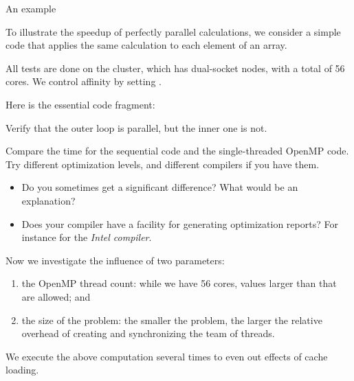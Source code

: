  {An example}

To illustrate the speedup of perfectly parallel calculations,
we consider a simple code that applies the same calculation
to each element of an array.

All tests are done on the  cluster,
which has dual-socket  nodes,
with a total of 56 cores.
We control affinity by setting
.

Here is the essential code fragment:

\begin{exercise}
  Verify that the outer loop is parallel, but the inner one is not.
\end{exercise}

\begin{exercise}
  Compare the time for the sequential code and the single-threaded OpenMP code.
  Try different optimization levels, and different compilers if you have them.
  \begin{itemize}
  \item
    Do you sometimes get a significant difference? What would be an explanation?
  \item Does your compiler have a facility for generating optimization reports?
    For instance  for the
    \emph{Intel compiler}.
  \end{itemize}
\end{exercise}

Now we investigate the influence of two parameters:
\begin{enumerate}
\item the OpenMP thread count: while we have 56 cores, values larger than that are allowed; and
\item the size of the problem: the smaller the problem, the larger the relative overhead
  of creating and synchronizing the team of threads.
\end{enumerate}
We execute the above computation several times to even out effects of cache loading.

